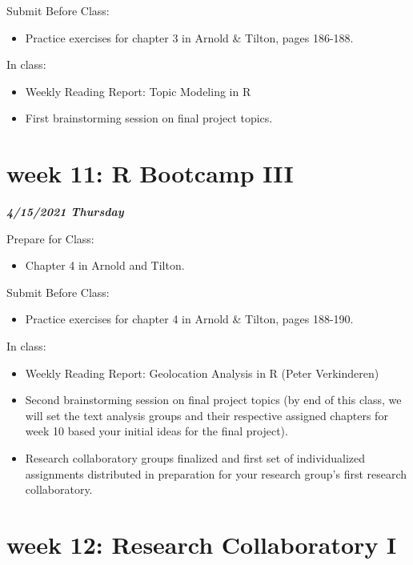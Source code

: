 \documentclass[
]{book}
\providecommand{\tightlist}{%
  \setlength{\itemsep}{0pt}\setlength{\parskip}{0pt}}
\begin{document}
Submit Before Class:

\begin{itemize}
\tightlist
\item
  Practice exercises for chapter 3 in Arnold \& Tilton, pages 186-188.
\end{itemize}

In class:

\begin{itemize}
\tightlist
\item
  Weekly Reading Report: Topic Modeling in R
\item
  First brainstorming session on final project topics.
\end{itemize}

\hypertarget{week-11-r-bootcamp-iii-1}{%
\chapter{week 11: R Bootcamp III}\label{week-11-r-bootcamp-iii-1}}

\textbf{\emph{4/15/2021 Thursday}}

Prepare for Class:

\begin{itemize}
\tightlist
\item
  Chapter 4 in Arnold and Tilton.
\end{itemize}

Submit Before Class:

\begin{itemize}
\tightlist
\item
  Practice exercises for chapter 4 in Arnold \& Tilton, pages 188-190.
\end{itemize}

In class:

\begin{itemize}
\tightlist
\item
  Weekly Reading Report: Geolocation Analysis in R (Peter Verkinderen)
\item
  Second brainstorming session on final project topics (by end of this class, we will set the text analysis groups and their respective assigned chapters for week 10 based your initial ideas for the final project).
\item
  Research collaboratory groups finalized and first set of individualized assignments distributed in preparation for your research group's first research collaboratory.
\end{itemize}

\hypertarget{week-12-research-collaboratory-i-1}{%
\chapter{week 12: Research Collaboratory I}\label{week-12-research-collaboratory-i-1}}
\end{document}
